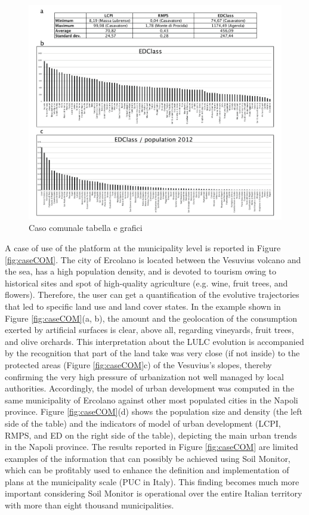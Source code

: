 \documentclass[APA,LATO1COL,doublespace]{WileyNJD-v2}
\begin{document}
\begin{figure}
    \centerline{
        \includegraphics[width=450pt]{daMileti/08_caso_comunale_tabella_grafici.pdf}
    }
    \caption{Caso comunale tabella e grafici}
    \label{fig:caseCOM_tabPlots}
\end{figure}

A case of use of the platform at the municipality level is reported in Figure \ref{fig:caseCOM}. 
The city of Ercolano is located between the Vesuvius volcano and the sea, has a high population density, and is devoted to tourism owing to historical sites and spot of high-quality agriculture (e.g. wine, fruit trees, and flowers). 
Therefore, the user can get a quantification of the evolutive trajectories that led to specific land use and land cover states. 
In the example shown in Figure \ref{fig:caseCOM}(a, b), the amount and the geolocation of the consumption exerted by artificial surfaces is clear, above all, regarding vineyards, fruit trees, and olive orchards. 
This interpretation about the LULC evolution is accompanied by the recognition that part of the land take was very close (if not inside) to the protected areas (Figure \ref{fig:caseCOM}c) of the Vesuvius's slopes, thereby confirming the very high pressure of urbanization not well managed by local authorities.
Accordingly, the model of urban development was computed in the same municipality of Ercolano against other most populated cities in the Napoli province. 
Figure \ref{fig:caseCOM}(d) shows the population size and density (the left side of the table) and the indicators of model of urban development (LCPI, RMPS, and ED on the right side of the table), depicting the main urban trends in the Napoli province. 
The results reported in Figure \ref{fig:caseCOM} are limited examples of the information that can possibly be achieved using Soil Monitor, which can be profitably used to enhance the definition and implementation of plans at the municipality scale (PUC in Italy). 
This finding becomes much more important considering Soil Monitor is operational over the entire Italian territory with more than eight thousand municipalities.
\end{document}
